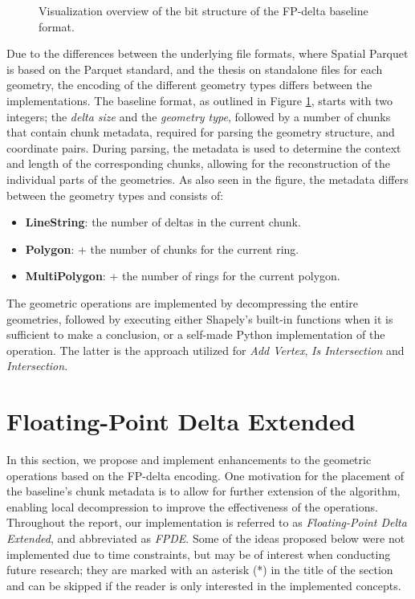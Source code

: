 \begin{figure}[htbp]
    \centering
    
    \caption{Visualization overview of the bit structure of the FP-delta baseline format.}
    \label{img:fp_delta_base}
\end{figure}

Due to the differences between the underlying file formats, where Spatial Parquet is based on the Parquet standard, and the thesis on standalone files for each geometry, the encoding of the different geometry types differs between the implementations. The baseline format, as outlined in Figure \ref{img:fp_delta_base}, starts with two integers; the \textit{delta size} and the \textit{geometry type}, followed by a number of chunks that contain chunk metadata, required for parsing the geometry structure, and coordinate pairs. During parsing, the metadata is used to determine the context and length of the corresponding chunks, allowing for the reconstruction of the individual parts of the geometries. As also seen in the figure, the metadata differs between the geometry types and consists of:
\begin{itemize}
    \item \textbf{LineString}: the number of deltas in the current chunk.
    \item \textbf{Polygon}: + the number of chunks for the current ring.
    \item \textbf{MultiPolygon}: + the number of rings for the current polygon.
\end{itemize}

The geometric operations are implemented by decompressing the entire geometries, followed by executing either Shapely's built-in functions when it is sufficient to make a conclusion, or a self-made Python implementation of the operation. The latter is the approach utilized for \emph{Add Vertex}, \textit{Is Intersection} and \textit{Intersection}.




\section{Floating-Point Delta Extended}
In this section, we propose and implement enhancements to the geometric operations based on the FP-delta encoding. One motivation for the placement of the baseline's chunk metadata is to allow for further extension of the algorithm, enabling local decompression to improve the effectiveness of the operations. Throughout the report, our implementation is referred to as \emph{Floating-Point Delta Extended}, and abbreviated as \emph{FPDE}. Some of the ideas proposed below were not implemented due to time constraints, but may be of interest when conducting future research; they are marked with an asterisk (*) in the title of the section and can be skipped if the reader is only interested in the implemented concepts.

